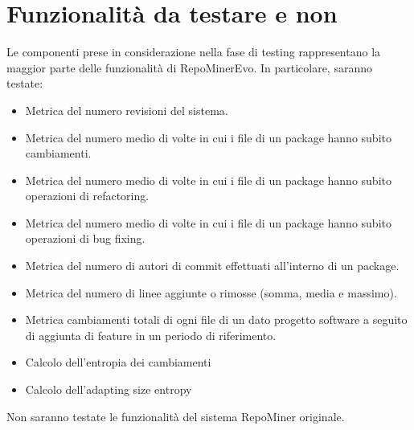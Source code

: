 \chapter{Funzionalità da testare e non}
Le componenti prese in considerazione nella fase di testing  rappresentano la maggior parte delle funzionalità di RepoMinerEvo. In particolare, saranno testate:\\

\begin{itemize}
\item Metrica del numero revisioni del sistema.
\item Metrica del numero medio di volte in cui i file di un package hanno subito cambiamenti.
\item Metrica del numero medio di volte in cui i file di un package hanno subito operazioni di refactoring.
\item Metrica del numero medio di volte in cui i file di un package hanno subito operazioni di bug fixing.
\item Metrica del numero di autori di commit effettuati all'interno di un package.
\item Metrica del numero di linee aggiunte o rimosse (somma, media e massimo).
\item Metrica cambiamenti totali di ogni file di un dato progetto software a seguito di aggiunta di feature in un periodo di riferimento.
\item Calcolo dell'entropia dei cambiamenti
\item Calcolo dell'adapting size entropy
\end{itemize}
\vspace{0.5cm}
Non saranno testate le funzionalità del sistema RepoMiner originale.\\